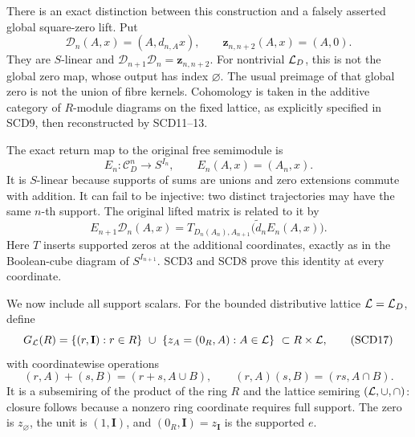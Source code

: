 There is an exact distinction between this construction and a
falsely asserted global square-zero lift. Put
\[
 \mathcal D_n(A,x)=(A,d_{n,A}x),\qquad
 \mathbf z_{n,n+2}(A,x)=(A,0).
 \tag{SCD14}
\]
They are \(S\)-linear and
\(\mathcal D_{n+1}\mathcal D_n=\mathbf z_{n,n+2}\).
For nontrivial \(\mathcal L_D\), this is not the global zero map,
whose output has index \(\varnothing\). The usual preimage of
that global zero is not the union of fibre kernels.
Cohomology is taken in the additive category of \(R\)-module
diagrams on the fixed lattice, as explicitly specified in SCD9,
then reconstructed by SCD11--13.

The exact return map to the original free semimodule is
\[
 E_n:\mathcal C_D^n\to S^{I_n},\qquad E_n(A,x)=(A_n,x).
 \tag{SCD15}
\]
It is \(S\)-linear because supports of sums are unions and
zero extensions commute with addition. It can fail to be injective:
two distinct trajectories may have the same \(n\)-th support.
The original lifted matrix is related to it by
\[
 E_{n+1}\mathcal D_n(A,x)
 =T_{D_n(A_n),A_{n+1}}\bigl(\widetilde d_n E_n(A,x)\bigr).
 \tag{SCD16}
\]
Here \(T\) inserts supported zeros at the additional coordinates,
exactly as in the Boolean-cube diagram of \(S^{I_{n+1}}\).
SCD3 and SCD8 prove this identity at every coordinate.

We now include all support scalars. For the bounded distributive
lattice \(\mathcal L=\mathcal L_D\), define
\[
 G_{\mathcal L}(R)
 =\{(r,\mathbf I):r\in R\}\ \cup\
   \{z_A=(0_R,A):A\in\mathcal L\}\ \subset R\times\mathcal L,
 \tag{SCD17}
\]
with coordinatewise operations
\[
 (r,A)+(s,B)=(r+s,A\cup B),\qquad
 (r,A)(s,B)=(rs,A\cap B).
\]
It is a subsemiring of the product of the ring \(R\) and the lattice
semiring \((\mathcal L,\cup,\cap)\): closure follows because a nonzero
ring coordinate requires full support. The zero is \(z_\varnothing\),
the unit is \((1,\mathbf I)\), and
\((0_R,\mathbf I)=z_{\mathbf I}\) is the supported \(e\).

